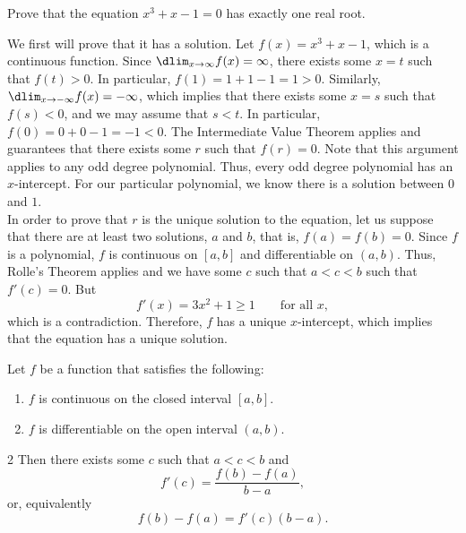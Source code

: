 \documentclass{book}
\begin{document}
\begin{Exam} Prove that the equation $x^3+x-1 = 0$ has exactly one real root.\\

\begin{pf}
We first will prove that it has a solution. Let $f(x) = x^3+x-1$, which is a continuous function. Since $\dlim_{x\to \infty} f(x) = \infty$, there exists some $x=t$ such that $f(t) > 0$. In particular, $f(1) = 1+1-1 = 1 > 0$. Similarly, $\dlim_{x\to -\infty} f(x) = -\infty$, which implies that there exists some $x=s$ such that $f(s) < 0$, and we may assume that $s< t$. In particular, $f(0) = 0 + 0 -1 = -1< 0$. The Intermediate Value Theorem applies and guarantees that there exists some $r$ such that $f(r) = 0$. Note that this argument applies to any odd degree polynomial. Thus, every odd degree polynomial has an $x$-intercept. For our particular polynomial, we know there is a solution between $0$ and $1$.\\

In order to prove that $r$ is the unique solution to the equation, let us suppose that there are at least two solutions, $a$ and $b$, that is, $f(a) = f(b) = 0$. Since $f$ is a polynomial, $f$ is continuous on $[a,b]$ and differentiable on $(a,b)$. Thus, Rolle's Theorem applies and we have some $c$ such that $a < c < b$ such that $f'(c) = 0$. But \[f'(x) = 3x^2 + 1 \ge 1\qquad \text{for all } x,\] which is a contradiction. Therefore, $f$ has a unique $x$-intercept, which implies that the equation has a unique solution. 
\end{pf}
\end{Exam}\vs

\begin{Thm}  Let $f$ be a function that satisfies the following:
\begin{enumerate}[!THM!,start=1]
\item $f$ is continuous on the closed interval $[a,b]$.
\item $f$ is differentiable on the open interval $(a,b)$.
\end{enumerate} 
\begin{multicols}{2} Then there exists some $c$  such that $a< c< b$ and \[f'(c) = \dfrac{f(b)-f(a)}{b-a},\] or, equivalently \[f(b)-f(a) = f'(c)(b-a).\]
\begin{center}
\end{center}
\end{multicols}
\end{Thm}\vs
\end{document}
